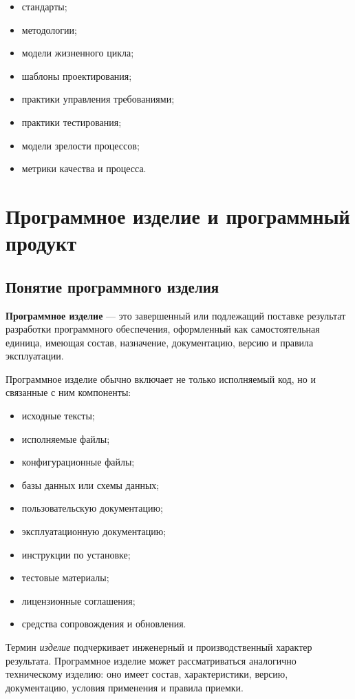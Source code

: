 \documentclass[12pt,a4paper]{article}
\begin{document}
\begin{itemize}
    \item стандарты;
    \item методологии;
    \item модели жизненного цикла;
    \item шаблоны проектирования;
    \item практики управления требованиями;
    \item практики тестирования;
    \item модели зрелости процессов;
    \item метрики качества и процесса.
\end{itemize}

\section{Программное изделие и программный продукт}

\subsection{Понятие программного изделия}

\textbf{Программное изделие} --- это завершенный или подлежащий поставке результат разработки программного обеспечения, оформленный как самостоятельная единица, имеющая состав, назначение, документацию, версию и правила эксплуатации.

Программное изделие обычно включает не только исполняемый код, но и связанные с ним компоненты:

\begin{itemize}
    \item исходные тексты;
    \item исполняемые файлы;
    \item конфигурационные файлы;
    \item базы данных или схемы данных;
    \item пользовательскую документацию;
    \item эксплуатационную документацию;
    \item инструкции по установке;
    \item тестовые материалы;
    \item лицензионные соглашения;
    \item средства сопровождения и обновления.
\end{itemize}

Термин \emph{изделие} подчеркивает инженерный и производственный характер результата. Программное изделие может рассматриваться аналогично техническому изделию: оно имеет состав, характеристики, версию, документацию, условия применения и правила приемки.
\end{document}

